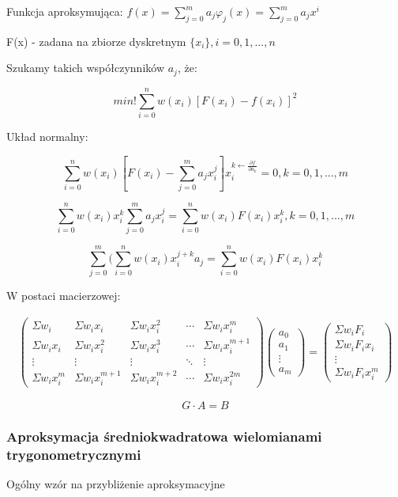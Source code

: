 \documentclass{article}
\begin{document}
\noindent
Funkcja aproksymująca: \(f(x) = \sum_{j=0}^{m}a_j\varphi_j(x) = \sum_{j=0}^{m}a_jx^i\)

\noindent
F(x) - zadana na zbiorze dyskretnym \(\{x_i\}, i = 0, 1, ..., n\)

\noindent
Szukamy takich współczynników \(a_j\), że:

\[min!\sum_{i=0}^{n}w(x_i)[F(x_i) - f(x_i)]^2\]

\noindent
Układ normalny:

\[\sum_{i = 0}^{n}w(x_i)[F(x_i) - \sum_{j=0}^{m}a_jx_i^j]x_i^{k\longleftarrow \frac{\partial f}{\partial a_k}} = 0, k = 0, 1, ..., m\]

\[\sum_{i = 0}^{n}w(x_i)x_i^k\sum_{j=0}^{m}a_jx_i^j = \sum_{i=0}^{n}w(x_i)F(x_i)x_i^k, k =0,1,...,m\]

\[\sum_{j=0}^{m}(\sum_{i=0}^{n}w(x_i)x_i^{j+k}a_j = \sum_{i=0}^{n}w(x_i)F(x_i)x_i^k\]

\noindent
W postaci macierzowej:

\begin{gather*}
\begin{pmatrix}
\Sigma w_i & \Sigma w_ix_i & \Sigma w_ix_i^2 & \cdots & \Sigma w_ix_i^m \\
\Sigma w_ix_i & \Sigma w_ix_i^2 & \Sigma w_ix_i^3 & \cdots & \Sigma w_ix_i^{m+1} \\
\vdots & \vdots & \vdots & \ddots & \vdots \\
\Sigma w_ix_i^m & \Sigma w_ix_i^{m+1} & \Sigma w_ix_i^{m+2} & \cdots & \Sigma w_ix_i^{2m} 
\end{pmatrix} 
\begin{pmatrix}
a_0 \\
a_1 \\
\vdots \\
a_m 
\end{pmatrix}
= 
\begin{pmatrix}
\Sigma w_iF_i \\
\Sigma w_iF_ix_i \\
\vdots \\
\Sigma w_iF_ix_i^m 
\end{pmatrix}
\end{gather*}

\[G \cdot A=B\]

\subsubsection{Aproksymacja średniokwadratowa wielomianami trygonometrycznymi}

Ogólny wzór na przybliżenie aproksymacyjne
\end{document}

